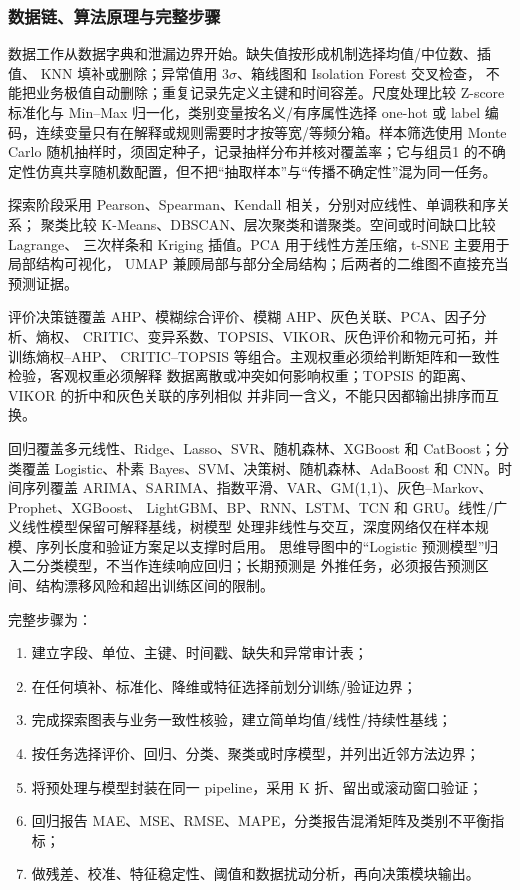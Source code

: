 \subsubsection{数据链、算法原理与完整步骤}

数据工作从数据字典和泄漏边界开始。缺失值按形成机制选择均值/中位数、插值、
KNN 填补或删除；异常值用 $3\sigma$、箱线图和 Isolation Forest 交叉检查，
不能把业务极值自动删除；重复记录先定义主键和时间容差。尺度处理比较
Z-score 标准化与 Min--Max 归一化，类别变量按名义/有序属性选择 one-hot 或
label 编码，连续变量只有在解释或规则需要时才按等宽/等频分箱。样本筛选使用
Monte Carlo 随机抽样时，须固定种子，记录抽样分布并核对覆盖率；它与组员1
的不确定性仿真共享随机数配置，但不把“抽取样本”与“传播不确定性”混为同一任务。

探索阶段采用 Pearson、Spearman、Kendall 相关，分别对应线性、单调秩和序关系；
聚类比较 K-Means、DBSCAN、层次聚类和谱聚类。空间或时间缺口比较 Lagrange、
三次样条和 Kriging 插值。PCA 用于线性方差压缩，t-SNE 主要用于局部结构可视化，
UMAP 兼顾局部与部分全局结构；后两者的二维图不直接充当预测证据。

评价决策链覆盖 AHP、模糊综合评价、模糊 AHP、灰色关联、PCA、因子分析、熵权、
CRITIC、变异系数、TOPSIS、VIKOR、灰色评价和物元可拓，并训练熵权--AHP、
CRITIC--TOPSIS 等组合。主观权重必须给判断矩阵和一致性检验，客观权重必须解释
数据离散或冲突如何影响权重；TOPSIS 的距离、VIKOR 的折中和灰色关联的序列相似
并非同一含义，不能只因都输出排序而互换。

回归覆盖多元线性、Ridge、Lasso、SVR、随机森林、XGBoost 和 CatBoost；分类覆盖
Logistic、朴素 Bayes、SVM、决策树、随机森林、AdaBoost 和 CNN。时间序列覆盖
ARIMA、SARIMA、指数平滑、VAR、GM(1,1)、灰色--Markov、Prophet、XGBoost、
LightGBM、BP、RNN、LSTM、TCN 和 GRU。线性/广义线性模型保留可解释基线，树模型
处理非线性与交互，深度网络仅在样本规模、序列长度和验证方案足以支撑时启用。
思维导图中的“Logistic 预测模型”归入二分类模型，不当作连续响应回归；长期预测是
外推任务，必须报告预测区间、结构漂移风险和超出训练区间的限制。

完整步骤为：
\begin{enumerate}
  \item 建立字段、单位、主键、时间戳、缺失和异常审计表；
  \item 在任何填补、标准化、降维或特征选择前划分训练/验证边界；
  \item 完成探索图表与业务一致性核验，建立简单均值/线性/持续性基线；
  \item 按任务选择评价、回归、分类、聚类或时序模型，并列出近邻方法边界；
  \item 将预处理与模型封装在同一 pipeline，采用 K 折、留出或滚动窗口验证；
  \item 回归报告 MAE、MSE、RMSE、MAPE，分类报告混淆矩阵及类别不平衡指标；
  \item 做残差、校准、特征稳定性、阈值和数据扰动分析，再向决策模块输出。
\end{enumerate}

